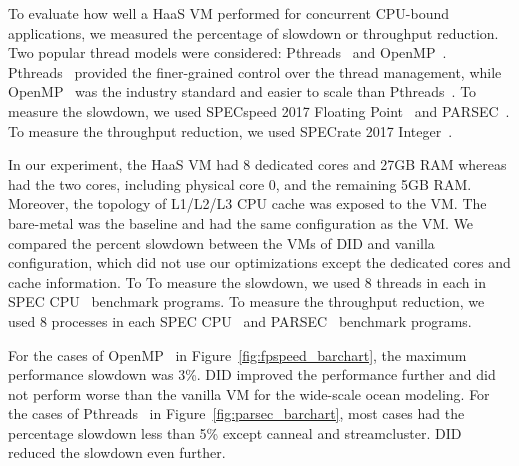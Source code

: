 



To evaluate how well a HaaS VM performed for concurrent
CPU-bound applications, we measured the percentage of slowdown
or throughput reduction. Two popular thread models were
considered: Pthreads~\cite{lewis:1998} and
OpenMP~\cite{dagum:1998}. Pthreads~\cite{lewis:1998} provided
the finer-grained control over the thread management, while
OpenMP~\cite{dagum:1998} was the industry standard and easier
to scale than Pthreads~\cite{lewis:1998}. To measure the
slowdown, we used SPECspeed 2017 Floating
Point~\cite{bucek:2018} and PARSEC~\cite{lewis:1998}. To
measure the throughput reduction, we used SPECrate 2017
Integer~\cite{bucek:2018}.

In our experiment, the HaaS VM had 8 dedicated cores and 27GB
RAM whereas \na had the two cores, including physical core 0,
and the remaining 5GB RAM. Moreover, the topology of L1/L2/L3
CPU cache was exposed to the VM. The bare-metal was the
baseline and had the same configuration as the VM. We compared
the percent slowdown between the VMs of DID and vanilla
configuration, which did not use our optimizations except the
dedicated cores and cache information. To To measure the
slowdown, we used 8 threads in each in SPEC
CPU~\cite{bucek:2018} benchmark programs. To measure the
throughput reduction, we used 8 processes in each SPEC
CPU~\cite{bucek:2018} and PARSEC~\cite{lewis:1998} benchmark
programs.

For the cases of OpenMP~\cite{dagum:1998} in
Figure~\ref{fig:fpspeed_barchart}, the maximum performance
slowdown was 3\%. DID improved the performance further and did
not perform worse than the vanilla VM for the wide-scale ocean
modeling. For the cases of Pthreads~\cite{lewis:1998} in
Figure~\ref{fig:parsec_barchart}, most cases had the
percentage slowdown less than 5\% except canneal and
streamcluster. DID reduced the slowdown even further.

